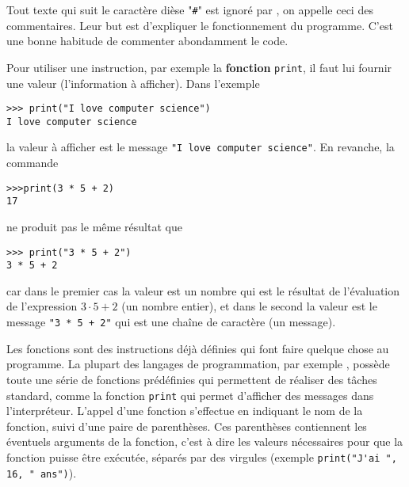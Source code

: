 \begin{eclairage}
	Tout texte qui suit le caractère dièse "\lstinline{#}" est ignoré par \py, on appelle ceci des commentaires. Leur but est d’expliquer le fonctionnement du programme. C’est une bonne habitude de commenter abondamment le code.
\end{eclairage}
Pour utiliser une instruction, par exemple la \textbf{fonction} \lstinline{print}, il faut lui fournir une valeur (l'information à afficher). Dans l'exemple
\begin{lstlisting}[numbers=none]
>>> print("I love computer science")
I love computer science
\end{lstlisting}\vspace*{-10px}
la valeur à afficher est le message \lstinline{"I love computer science"}. En revanche, la commande 
\begin{lstlisting}[numbers=none]
>>>print(3 * 5 + 2)
17
\end{lstlisting}\vspace*{-10px}
ne produit pas le même résultat que 
\begin{lstlisting}[numbers=none]
>>> print("3 * 5 + 2")
3 * 5 + 2
\end{lstlisting}\vspace*{-10px}
car dans le premier cas la valeur est un nombre qui est le résultat de l'évaluation de l'expression $3\cdot 5 +2$ (un nombre entier), et dans le second la valeur est le message \lstinline{"3 * 5 + 2"} qui est une chaîne de caractère (un message).
\begin{eclairage}
	Les fonctions sont des instructions déjà définies qui font faire quelque chose au programme. La plupart des langages de programmation, par exemple \py, possède toute une série de fonctions prédéfinies qui permettent de réaliser des tâches standard, comme la fonction \lstinline{print} qui permet d'afficher des messages dans l'interpréteur. L'appel d'une fonction s'effectue en indiquant le nom	de la fonction, suivi d'une paire de parenthèses. Ces parenthèses contiennent les éventuels arguments de la fonction, c'est à dire les valeurs nécessaires pour que la fonction puisse être exécutée, séparés par des virgules (exemple \lstinline{print("J'ai ", 16, " ans")}).
\end{eclairage}


